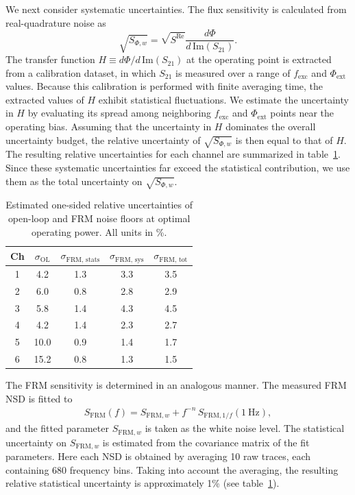 \documentclass[
 prd,
 reprint,
 superscriptaddress,
 amsmath,amssymb,
 aps,
 floatfix,
]{revtex4-2}
\begin{document}
We next consider systematic uncertainties. The flux sensitivity is calculated from real-quadrature noise as
\begin{equation}
    \sqrt{S_{\Phi,w}} = \sqrt{S^{\text{Re}}} \frac{d\Phi}{d\,\mathrm{Im}(S_{21})}.
\end{equation}
The transfer function $H \equiv d\Phi/d\,\mathrm{Im}(S_{21})$ at the operating point is extracted from a calibration dataset, in which $S_{21}$ is measured over a range of $f_{\mathrm{exc}}$ and $\Phi_{\mathrm{ext}}$ values. Because this calibration is performed with finite averaging time, the extracted values of $H$ exhibit statistical fluctuations. We estimate the uncertainty in $H$ by evaluating its spread among neighboring $f_{\mathrm{exc}}$ and $\Phi_{\mathrm{ext}}$ points near the operating bias. Assuming that the uncertainty in $H$ dominates the overall uncertainty budget, the relative uncertainty of $\sqrt{S_{\Phi,w}}$ is then equal to that of $H$. The resulting relative uncertainties for each channel are summarized in table~\ref{tab:uncertainties}. Since these systematic uncertainties far exceed the statistical contribution, we use them as the total uncertainty on $\sqrt{S_{\Phi,w}}$.

\begin{table}[htb]
    \centering
    \begin{tabular}{c c c c c}
    \hline
         Ch & $\sigma_{\text{OL}}$ & $\sigma_{\text{FRM, stats}}$ & $\sigma_{\text{FRM, sys}}$ & $\sigma_{\text{FRM, tot}}$\\
    \hline
    1 & 4.2 & 1.3 & 3.3 & 3.5\\
    2 & 6.0 & 0.8 & 2.8 & 2.9\\
    3 & 5.8 & 1.4 & 4.3 & 4.5\\
    4 & 4.2 & 1.4 & 2.3 & 2.7\\
    5 & 10.0 & 0.9 & 1.4 & 1.7\\
    6 & 15.2 & 0.8 & 1.3 & 1.5\\
    \hline
    \end{tabular}
    \caption{Estimated one-sided relative uncertainties of open-loop and FRM noise floors at optimal operating power. All units in \%.}
    \label{tab:uncertainties}
\end{table}


The FRM sensitivity is determined in an analogous manner. The measured FRM NSD is fitted to
\begin{gather}
    S_{\mathrm{FRM}}(f) = S_{\mathrm{FRM},w} + f^{-n} \, S_{\mathrm{FRM},1/f}(1~\mathrm{Hz}),
\end{gather}
and the fitted parameter $S_{\mathrm{FRM},w}$ is taken as the white noise level. The statistical uncertainty on $S_{\mathrm{FRM},w}$ is estimated from the covariance matrix of the fit parameters. Here each NSD is obtained by averaging 10 raw traces, each containing 680 frequency bins. Taking into account the averaging, the resulting relative statistical uncertainty is approximately 1\% (see table~\ref{tab:uncertainties}).
\end{document}
